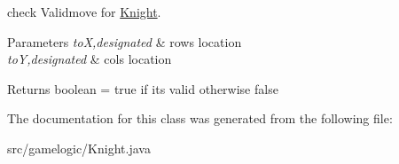 check Validmove for \mbox{\hyperlink{classgamelogic_1_1_knight}{Knight}}. 
\begin{DoxyParams}{Parameters}
{\em toX,designated} & row\textquotesingle{}s location \\
\hline
{\em toY,designated} & col\textquotesingle{}s location \\
\hline
\end{DoxyParams}
\begin{DoxyReturn}{Returns}
boolean = true if it\textquotesingle{}s valid otherwise false 
\end{DoxyReturn}


The documentation for this class was generated from the following file\+:\begin{DoxyCompactItemize}
\item 
src/gamelogic/Knight.\+java\end{DoxyCompactItemize}
